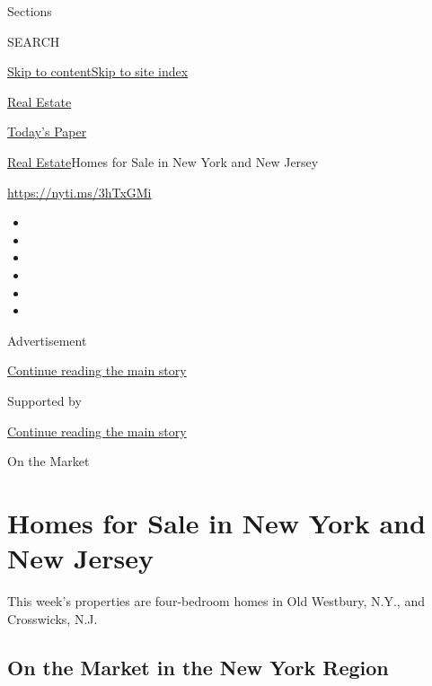 Sections

SEARCH

\protect\hyperlink{site-content}{Skip to
content}\protect\hyperlink{site-index}{Skip to site index}

\href{https://www.nytimes3xbfgragh.onion/section/realestate}{Real
Estate}

\href{https://myaccount.nytimes3xbfgragh.onion/auth/login?response_type=cookie\&client_id=vi}{}

\href{https://www.nytimes3xbfgragh.onion/section/todayspaper}{Today's
Paper}

\href{/section/realestate}{Real Estate}\textbar{}Homes for Sale in New
York and New Jersey

\url{https://nyti.ms/3hTxGMi}

\begin{itemize}
\item
\item
\item
\item
\item
\item
\end{itemize}

Advertisement

\protect\hyperlink{after-top}{Continue reading the main story}

Supported by

\protect\hyperlink{after-sponsor}{Continue reading the main story}

On the Market

\hypertarget{homes-for-sale-in-new-york-and-new-jersey}{%
\section{Homes for Sale in New York and New
Jersey}\label{homes-for-sale-in-new-york-and-new-jersey}}

This week's properties are four-bedroom homes in Old Westbury, N.Y., and
Crosswicks, N.J.

\href{https://www.nytimes3xbfgragh.onion/slideshow/2020/07/30/realestate/on-the-market-in-the-new-york-region.html}{}

\hypertarget{on-the-market-in-the-new-york-region}{%
\subsection{On the Market in the New York
Region}\label{on-the-market-in-the-new-york-region}}

